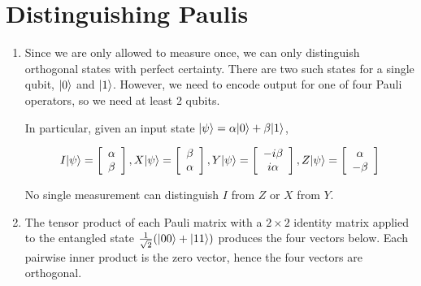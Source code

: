 \documentclass[12pt]{article}
\begin{document}
\pagebreak

\section{Distinguishing Paulis}

\begin{enumerate}
\item %
Since we are only allowed to measure once, we can only distinguish
orthogonal states with perfect certainty. There are two such states for
a single qubit, $|0 \rangle$ and $|1 \rangle$. However, we need to encode output
for one of four Pauli operators, so we need at least 2 qubits.

In particular, given an input state
$|\psi \rangle = \alpha|0 \rangle + \beta|1 \rangle$,

\begin{displaymath}
I|\psi \rangle =
\left[ \begin{array}{c}
\alpha\\
\beta
\end{array} \right],
X|\psi \rangle =
\left[ \begin{array}{c}
\beta\\
\alpha
\end{array} \right],
Y|\psi \rangle =
\left[ \begin{array}{c}
-i\beta\\
i\alpha
\end{array} \right],
Z|\psi \rangle =
\left[ \begin{array}{c}
\alpha\\
-\beta
\end{array} \right]
\end{displaymath}

No single measurement can distinguish $I$ from $Z$ or $X$ from $Y$.

\item %

The tensor product of each Pauli matrix with a $2\times2$ identity matrix
applied to the entangled state $\frac{1}{\sqrt{2}}(|00 \rangle+|11 \rangle)$ produces the
four vectors below. Each pairwise inner product is the zero vector, hence
the four vectors are orthogonal.


\end{enumerate}
\end{document}
